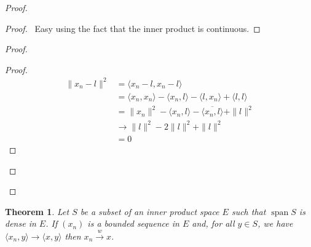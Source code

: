 \documentclass{book}
\let\qed\relax
\newtheorem{thm}[ax]{Theorem}
\theoremstyle{definition}
\newcommand{\spn}{\ensuremath{\operatorname{span}}}
\begin{document}
\begin{proof}
\pf
{}
\begin{proof}
	\pf\ Easy using the fact that the inner product is continuous.
\end{proof}
\begin{proof}
	\begin{proof}
		\pf
		\begin{align*}
			\|x_n - l\|^2 & = \langle x_n - l, x_n - l \rangle \\
			& = \langle x_n, x_n \rangle - \langle x_n, l \rangle - \langle l, x_n \rangle + \langle l,l \rangle \\
			& = \| x_n\|^2 - \langle x_n, l \rangle - \overline{\langle x_n, l \rangle} + \| l \|^2 \\
			& \rightarrow \|l\|^2 - 2 \|l\|^2 + \|l\|^2 \\
			& = 0
		\end{align*}
	\end{proof}
\end{proof}
\qed
\end{proof}

\begin{thm}
Let $S$ be a subset of an inner product space $E$ such that $\spn S$ is dense in $E$. If $(x_n)$ is a bounded sequence in $E$ and, for all $y \in S$, we have $\langle x_n, y \rangle \rightarrow \langle x,y \rangle$ then $x_n \stackrel{w}{\rightarrow} x$.
\end{thm}
\end{document}
